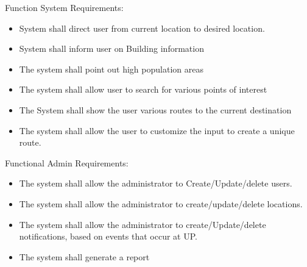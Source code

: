 {
Function System Requirements:
\begin{itemize}
  \item System shall direct user from current location to desired location.
  \item System shall inform user on Building information
  \item The system shall point out high population areas
  \item The system shall allow user to search for various points of interest
  \item The System shall show the user various routes to the current destination
  \item The system shall allow the user to customize the input to create a unique route.
\end{itemize}
\bigskip
Functional Admin Requirements:
\begin{itemize}
  \item The system shall allow the administrator to Create/Update/delete users.
  \item The system shall allow the administrator to create/update/delete locations.
  \item The system shall allow the administrator to create/Update/delete notifications, based on events that occur at UP. 
  \item The system shall generate a report
\end{itemize}
}

